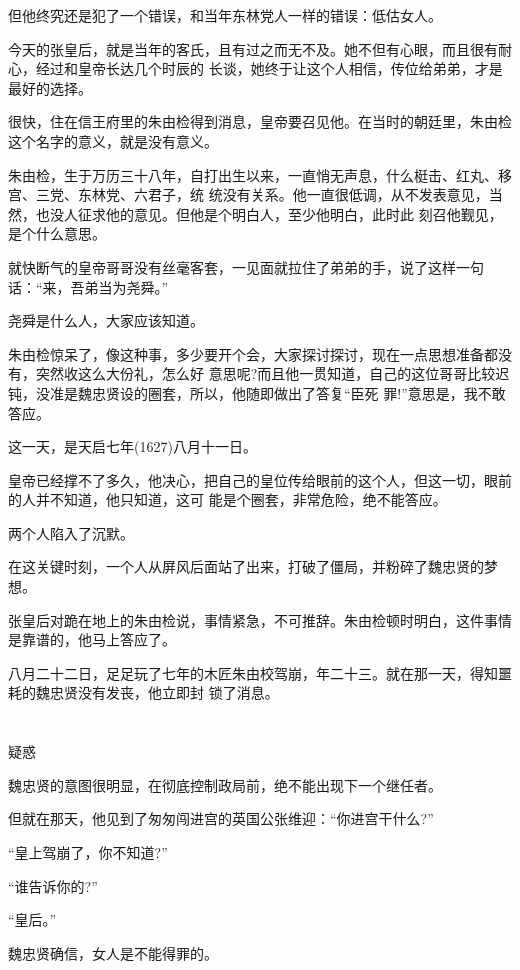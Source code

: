 \documentclass[11pt,a4paper,onecolumn]{article}
\begin{document}
但他终究还是犯了一个错误，和当年东林党人一样的错误：低估女人。

今天的张皇后，就是当年的客氏，且有过之而无不及。她不但有心眼，而且很有耐心，经过和皇帝长达几个时辰的
长谈，她终于让这个人相信，传位给弟弟，才是最好的选择。

很快，住在信王府里的朱由检得到消息，皇帝要召见他。在当时的朝廷里，朱由检这个名字的意义，就是没有意义。

朱由检，生于万历三十八年，自打出生以来，一直悄无声息，什么梃击、红丸、移宫、三党、东林党、六君子，统
统没有关系。他一直很低调，从不发表意见，当然，也没人征求他的意见。但他是个明白人，至少他明白，此时此
刻召他觐见，是个什么意思。

就快断气的皇帝哥哥没有丝毫客套，一见面就拉住了弟弟的手，说了这样一句话：``来，吾弟当为尧舜。''

尧舜是什么人，大家应该知道。

朱由检惊呆了，像这种事，多少要开个会，大家探讨探讨，现在一点思想准备都没有，突然收这么大份礼，怎么好
意思呢?而且他一贯知道，自己的这位哥哥比较迟钝，没准是魏忠贤设的圈套，所以，他随即做出了答复``臣死
罪!''意思是，我不敢答应。

这一天，是天启七年(1627)八月十一日。

皇帝已经撑不了多久，他决心，把自己的皇位传给眼前的这个人，但这一切，眼前的人并不知道，他只知道，这可
能是个圈套，非常危险，绝不能答应。

两个人陷入了沉默。

在这关键时刻，一个人从屏风后面站了出来，打破了僵局，并粉碎了魏忠贤的梦想。

张皇后对跪在地上的朱由检说，事情紧急，不可推辞。朱由检顿时明白，这件事情是靠谱的，他马上答应了。

八月二十二日，足足玩了七年的木匠朱由校驾崩，年二十三。就在那一天，得知噩耗的魏忠贤没有发丧，他立即封
锁了消息。

\section[\thesection]{}

疑惑

魏忠贤的意图很明显，在彻底控制政局前，绝不能出现下一个继任者。

但就在那天，他见到了匆匆闯进宫的英国公张维迎：``你进宫干什么?''

``皇上驾崩了，你不知道?''

``谁告诉你的?''

``皇后。''

魏忠贤确信，女人是不能得罪的。
\end{document}
